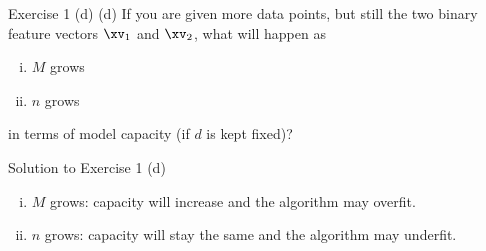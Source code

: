 \documentclass[aspectratio=169]{beamer}
\begin{document}
\begin{frame}{Exercise 1 (d)}
	(d) If you are given more data points, but still the two binary feature vectors $\xv_1$ and $\xv_2$, what will happen as 
	\begin{enumerate}[(i)]
		\item $M$ grows
		\item $n$ grows
	\end{enumerate}
	in terms of model capacity (if $d$ is kept fixed)?
\end{frame}

\begin{frame}{Solution to Exercise 1 (d)}
	\begin{enumerate}[(i)]
		\item $M$ grows: capacity will increase and the algorithm may overfit.
		\item $n$ grows: capacity will stay the same and the algorithm may underfit.
	\end{enumerate}
\end{frame}
\end{document}
